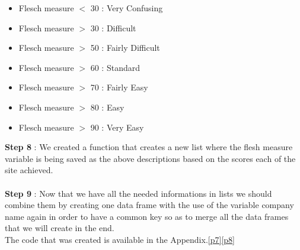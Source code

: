 \documentclass{article}
\begin{document}
\begin{itemize}
\item Flesch measure $<$ 30 : Very Confusing
\item Flesch measure $>$ 30 : Difficult
\item Flesch measure $>$ 50 : Fairly Difficult
\item Flesch measure $>$ 60 : Standard
\item Flesch measure $>$ 70 : Fairly Easy
\item Flesch measure $>$ 80 : Easy
\item Flesch measure $>$ 90 : Very Easy
\end{itemize}
\textbf{Step 8} : We created a function that creates a new list where the flesh measure variable is being saved as the above descriptions based on the scores each of the site achieved.\\\\
\textbf{Step 9} : Now that we have all the needed informations in lists we should combine them by creating one data frame with the use of the variable company name again in order to have a common key so as to merge all the data frames that we will create in the end.\\
The code that was created is available in the Appendix.\ref{p7}\ref{p8}
\end{document}
